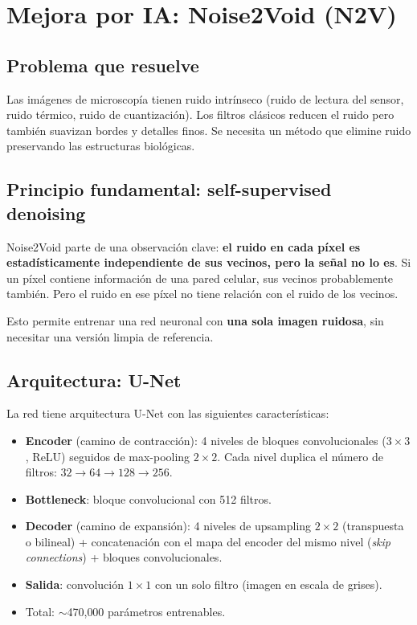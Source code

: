 \documentclass[11pt,a4paper]{article}
\begin{document}
\section{Mejora por IA: Noise2Void (N2V)}
\label{sec:n2v}

\subsection{Problema que resuelve}

Las im\'{a}genes de microscop\'{i}a tienen ruido intr\'{i}nseco (ruido de lectura del sensor, ruido t\'{e}rmico, ruido de cuantizaci\'{o}n). Los filtros cl\'{a}sicos reducen el ruido pero tambi\'{e}n suavizan bordes y detalles finos. Se necesita un m\'{e}todo que elimine ruido preservando las estructuras biol\'{o}gicas.

\subsection{Principio fundamental: self-supervised denoising}

Noise2Void parte de una observaci\'{o}n clave: \textbf{el ruido en cada p\'{i}xel es estad\'{i}sticamente independiente de sus vecinos, pero la se\~{n}al no lo es}. Si un p\'{i}xel contiene informaci\'{o}n de una pared celular, sus vecinos probablemente tambi\'{e}n. Pero el ruido en ese p\'{i}xel no tiene relaci\'{o}n con el ruido de los vecinos.

Esto permite entrenar una red neuronal con \textbf{una sola imagen ruidosa}, sin necesitar una versi\'{o}n limpia de referencia.

\subsection{Arquitectura: U-Net}

La red tiene arquitectura U-Net con las siguientes caracter\'{i}sticas:

\begin{itemize}
  \item \textbf{Encoder} (camino de contracci\'{o}n): 4 niveles de bloques convolucionales ($3 \times 3$, ReLU) seguidos de max-pooling $2 \times 2$. Cada nivel duplica el n\'{u}mero de filtros: $32 \to 64 \to 128 \to 256$.
  \item \textbf{Bottleneck}: bloque convolucional con 512 filtros.
  \item \textbf{Decoder} (camino de expansi\'{o}n): 4 niveles de upsampling $2 \times 2$ (transpuesta o bilineal) + concatenaci\'{o}n con el mapa del encoder del mismo nivel (\textit{skip connections}) + bloques convolucionales.
  \item \textbf{Salida}: convoluci\'{o}n $1 \times 1$ con un solo filtro (imagen en escala de grises).
  \item Total: $\sim$470{,}000 par\'{a}metros entrenables.
\end{itemize}
\end{document}
